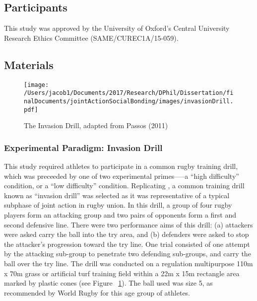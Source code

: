 \documentclass[english]{article}\usepackage[]{graphicx}\usepackage[]{color}
\begin{document}
\subsection{Participants}

This study was approved by the University of Oxford’s Central University Research Ethics Committee (SAME/CUREC1A/15-059).



\subsection{Materials}

\begin{figure}[htbp]
  \texttt{[image: /Users/jacob1/Documents/2017/Research/DPhil/Dissertation/finalDocuments/jointActionSocialBonding/images/invasionDrill.pdf]}
  \caption{The Invasion Drill, adapted from Passos (2011)}
  \label{fig:invasionDrill}
\end{figure}

\subsubsection{Experimental Paradigm: Invasion Drill}
This study required athletes to participate in a common rugby training drill, which was preceeded by one of two experimental primes—--a ``high difficulty'' condition, or a ``low difficulty'' condition.   Replicating \textcite{Passos2011}, a common training drill known as ``invasion drill'' \citep{Biscombe1998} was selected as it was representative of a typical subphase of joint action in rugby union.
In this drill, a group of four rugby players form an attacking group and two pairs of opponents form a first and second defensive line.  There were two performance aims of this drill: (a) attackers were asked carry the ball into the try area, and (b) defenders were asked to stop the attacker’s progression toward the try line.
One trial consisted of one attempt by the attacking sub-group to penetrate two defending sub-groups, and carry the ball over the try line. The drill was conducted on a regulation multipurpose 110m x 70m grass or artificial turf training field within a 22m x 15m rectangle area marked by plastic cones (see Figure ~\ref{fig:invasionDrill}). The ball used was size 5, as recommended by World Rugby for this age group of athletes.

\end{document}
